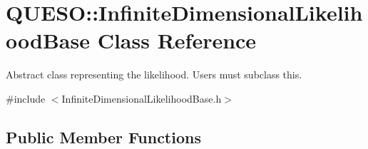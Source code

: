 \hypertarget{class_q_u_e_s_o_1_1_infinite_dimensional_likelihood_base}{\section{Q\-U\-E\-S\-O\-:\-:Infinite\-Dimensional\-Likelihood\-Base Class Reference}
\label{class_q_u_e_s_o_1_1_infinite_dimensional_likelihood_base}
}


Abstract class representing the likelihood. Users must subclass this.  




{\ttfamily \#include $<$Infinite\-Dimensional\-Likelihood\-Base.\-h$>$}

\subsection*{Public Member Functions}
